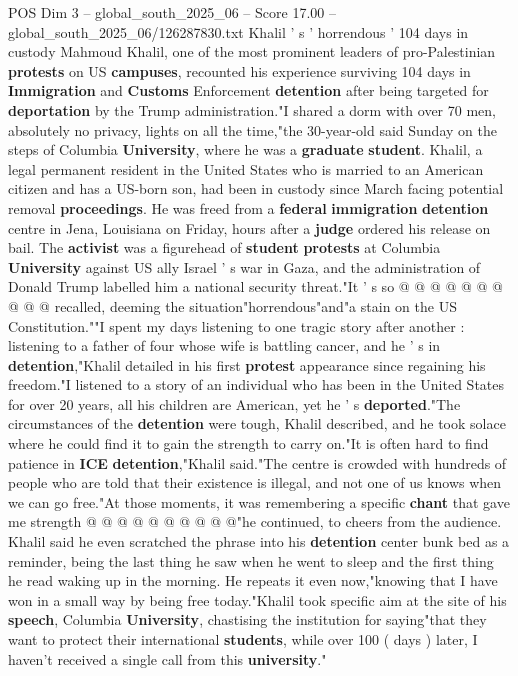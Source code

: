 \begin{textsample}{POS Dim 3 – global\_south\_2025\_06 – Score 17.00 – global\_south\_2025\_06/126287830.txt}  \label{ex:f3_pos_203}
Khalil ' s ' horrendous ' 104 days in custody Mahmoud Khalil, one of the most prominent leaders of pro-Palestinian \textbf{protests} on US \textbf{campuses}, recounted his experience surviving 104 days in \textbf{Immigration} and \textbf{Customs} Enforcement \textbf{detention} after being targeted for \textbf{deportation} by the Trump administration."I shared a dorm with over 70 men, absolutely no privacy, lights on all the time,"the 30-year-old said Sunday on the steps of Columbia \textbf{University}, where he was a \textbf{graduate} \textbf{student}.
Khalil, a legal permanent resident in the United States who is married to an American citizen and has a US-born son, had been in custody since March facing potential removal \textbf{proceedings}.
He was freed from a \textbf{federal} \textbf{immigration} \textbf{detention} centre in Jena, Louisiana on Friday, hours after a \textbf{judge} ordered his release on bail.
The \textbf{activist} was a figurehead of \textbf{student} \textbf{protests} at Columbia \textbf{University} against US ally Israel ' s war in Gaza, and the administration of Donald Trump labelled him a national security threat."It ' s so @ @ @ @ @ @ @ @ @ @ recalled, deeming the situation"horrendous"and"a stain on the US Constitution.""I spent my days listening to one tragic story after another : listening to a father of four whose wife is battling cancer, and he ' s in \textbf{detention},"Khalil detailed in his first \textbf{protest} appearance since regaining his freedom."I listened to a story of an individual who has been in the United States for over 20 years, all his children are American, yet he ' s \textbf{deported}."The circumstances of the \textbf{detention} were tough, Khalil described, and he took solace where he could find it to gain the strength to carry on."It is often hard to find patience in \textbf{ICE} \textbf{detention},"Khalil said."The centre is crowded with hundreds of people who are told that their existence is illegal, and not one of us knows when we can go free."At those moments, it was remembering a specific \textbf{chant} that gave me strength @ @ @ @ @ @ @ @ @ @"he continued, to cheers from the audience.
Khalil said he even scratched the phrase into his \textbf{detention} center bunk bed as a reminder, being the last thing he saw when he went to sleep and the first thing he read waking up in the morning.
He repeats it even now,"knowing that I have won in a small way by being free today."Khalil took specific aim at the site of his \textbf{speech}, Columbia \textbf{University}, chastising the institution for saying"that they want to protect their international \textbf{students}, while over 100 ( days ) later, I haven't received a single call from this \textbf{university}."

\end{textsample}
